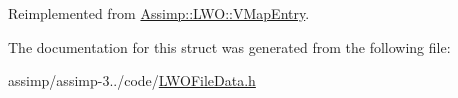 Reimplemented from \hyperlink{struct_assimp_1_1_l_w_o_1_1_v_map_entry_a1513e108a0008027742cd5530fb7e0c1}{Assimp\+::\+L\+W\+O\+::\+V\+Map\+Entry}.



The documentation for this struct was generated from the following file\+:\begin{DoxyCompactItemize}
\item 
assimp/assimp-\/3../code/\hyperlink{_l_w_o_file_data_8h}{L\+W\+O\+File\+Data.\+h}\end{DoxyCompactItemize}
